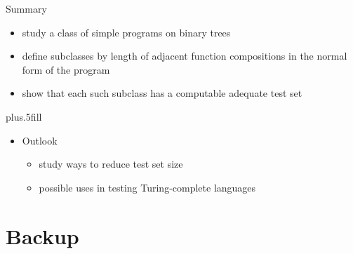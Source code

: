 \documentclass{beamer}
\begin{document}
\begin{frame}{Summary}

  \begin{itemize}
  \item study a class of simple programs on binary trees
  \item define subclasses by length of adjacent function compositions 
    in the normal form of the program
  \item show that each such subclass has a computable adequate test set
  \end{itemize}
  
  \vskip0pt plus.5fill
  \begin{itemize}
  \item
    Outlook
    \begin{itemize}
    \item study ways to reduce test set size
    \item possible uses in testing Turing-complete languages
    \end{itemize}
  \end{itemize}
\end{frame}

\appendix

\section*{Backup}
\end{document}
